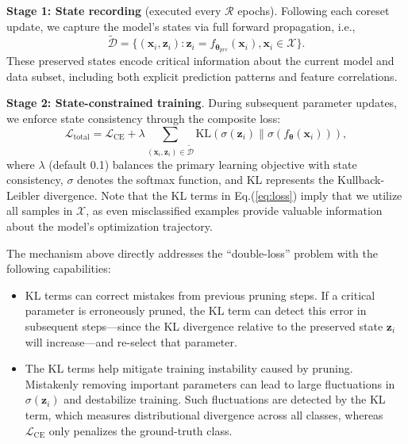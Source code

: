 \textbf{Stage 1: State recording} (executed every $\mathcal{R}$ epochs). Following each coreset update, we capture the model's states via full forward propagation, i.e.,  
$$\tilde{\mathcal{D}}=\{(\mathbf{x}_i, \mathbf{z}_i):
\mathbf{z}_i = f_{\boldsymbol{\theta}_{\textit{pre}}}(\mathbf{x}_i),  \mathbf{x}_i \in \mathcal{X}  \}.$$  
These preserved states encode critical information about the current model and data subset, including both explicit prediction patterns and feature correlations.  

\textbf{Stage 2: State-constrained training}. During subsequent parameter updates, we enforce state consistency through the composite loss:  
\begin{equation}
    \label{eq:loss}
    \mathcal{L}_{\text{total}} = \mathcal{L}_{\text{CE}} + \lambda\!\!\!\!\!\sum_{(\mathbf{x}_i,\mathbf{z}_i ) \in \tilde{\mathcal{D}}}\!\!\!\!\!\text{KL}(\sigma(\mathbf{z}_i) \| \sigma(f_{\boldsymbol{\theta}}(\mathbf{x}_i))), 
\end{equation}   
where $\lambda$ (default 0.1) balances the primary learning objective with state consistency, $\sigma$ denotes the softmax function, and KL represents the Kullback-Leibler divergence.
Note that the KL terms in Eq.(\ref{eq:loss}) imply that we utilize all samples in \(\mathcal{X}\), as even misclassified examples provide valuable information about the model’s optimization trajectory.  

The mechanism above directly addresses the “double-loss” problem with the following capabilities:
\begin{itemize}
    \item KL terms can correct mistakes from previous pruning steps. If a critical parameter is erroneously pruned, the KL term can detect this error in subsequent steps—since the KL divergence relative to the preserved state \(\mathbf{z}_i\) will increase—and re-select that parameter. 
    \item The KL terms help mitigate training instability caused by pruning. Mistakenly removing important parameters can lead to large fluctuations in \(\sigma(\mathbf{z}_i)\) and destabilize training. Such fluctuations are detected by the KL term, which measures distributional divergence across all classes, whereas \(\mathcal{L}_{\mathrm{CE}}\) only penalizes the ground-truth class.
\end{itemize}




